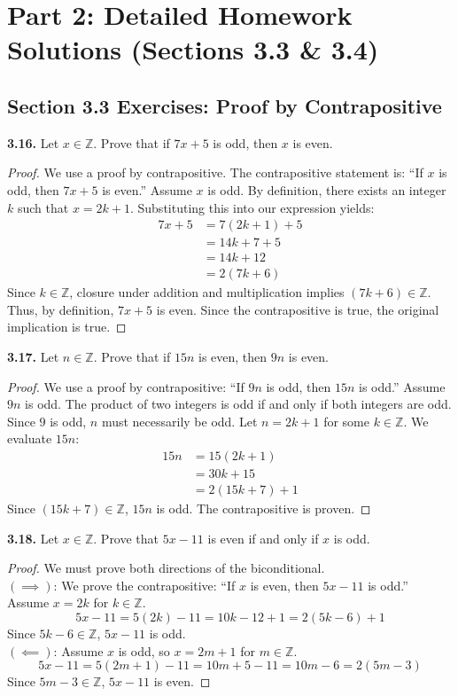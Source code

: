 \documentclass[11pt]{article}
\begin{document}
\newpage
\section{Part 2: Detailed Homework Solutions (Sections 3.3 \& 3.4)}

\subsection{Section 3.3 Exercises: Proof by Contrapositive}

\textbf{3.16.} Let $x \in \mathbb{Z}$. Prove that if $7x + 5$ is odd, then $x$ is even.
\begin{proof}
We use a proof by contrapositive. The contrapositive statement is: ``If $x$ is odd, then $7x+5$ is even.'' Assume $x$ is odd. By definition, there exists an integer $k$ such that $x = 2k + 1$. Substituting this into our expression yields:
\begin{align*}
    7x + 5 &= 7(2k + 1) + 5 \\
           &= 14k + 7 + 5 \\
           &= 14k + 12 \\
           &= 2(7k + 6)
\end{align*}
Since $k \in \mathbb{Z}$, closure under addition and multiplication implies $(7k + 6) \in \mathbb{Z}$. Thus, by definition, $7x + 5$ is even. Since the contrapositive is true, the original implication is true.
\end{proof}

\textbf{3.17.} Let $n \in \mathbb{Z}$. Prove that if $15n$ is even, then $9n$ is even.
\begin{proof}
We use a proof by contrapositive: ``If $9n$ is odd, then $15n$ is odd.'' Assume $9n$ is odd. The product of two integers is odd if and only if both integers are odd. Since $9$ is odd, $n$ must necessarily be odd. Let $n = 2k + 1$ for some $k \in \mathbb{Z}$. We evaluate $15n$:
\begin{align*}
    15n &= 15(2k + 1) \\
        &= 30k + 15 \\
        &= 2(15k + 7) + 1
\end{align*}
Since $(15k + 7) \in \mathbb{Z}$, $15n$ is odd. The contrapositive is proven.
\end{proof}

\textbf{3.18.} Let $x \in \mathbb{Z}$. Prove that $5x - 11$ is even if and only if $x$ is odd.
\begin{proof}
We must prove both directions of the biconditional. \\
$(\implies)$: We prove the contrapositive: ``If $x$ is even, then $5x - 11$ is odd.'' Assume $x = 2k$ for $k \in \mathbb{Z}$. 
\[ 5x - 11 = 5(2k) - 11 = 10k - 12 + 1 = 2(5k - 6) + 1 \]
Since $5k - 6 \in \mathbb{Z}$, $5x - 11$ is odd. \\
$(\impliedby)$: Assume $x$ is odd, so $x = 2m + 1$ for $m \in \mathbb{Z}$.
\[ 5x - 11 = 5(2m + 1) - 11 = 10m + 5 - 11 = 10m - 6 = 2(5m - 3) \]
Since $5m - 3 \in \mathbb{Z}$, $5x - 11$ is even. 
\end{proof}
\end{document}
